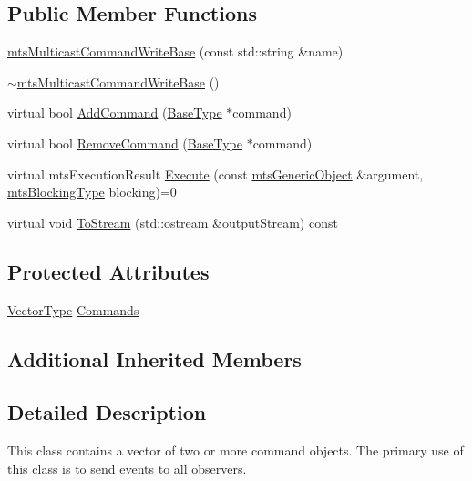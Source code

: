 \subsection*{Public Member Functions}
\begin{DoxyCompactItemize}
\item 
\hyperlink{classmts_multicast_command_write_base_a03fecc30b28f9ae0623eb8a8ba36c5d2}{mts\+Multicast\+Command\+Write\+Base} (const std\+::string \&name)
\item 
\hyperlink{classmts_multicast_command_write_base_af80f325cb7023dcef286ecaafe189841}{$\sim$mts\+Multicast\+Command\+Write\+Base} ()
\item 
virtual bool \hyperlink{classmts_multicast_command_write_base_a7163c96ed8d25927ea074bacfae410e1}{Add\+Command} (\hyperlink{classmts_command_write_base_a5d78c8590cfc73fa29d93b3678cba199}{Base\+Type} $\ast$command)
\item 
virtual bool \hyperlink{classmts_multicast_command_write_base_a2dd321ec3867b87877a7d8875e4dc896}{Remove\+Command} (\hyperlink{classmts_command_write_base_a5d78c8590cfc73fa29d93b3678cba199}{Base\+Type} $\ast$command)
\item 
virtual mts\+Execution\+Result \hyperlink{classmts_multicast_command_write_base_ab8a9cde81c9d5653defafd2093383a51}{Execute} (const \hyperlink{classmts_generic_object}{mts\+Generic\+Object} \&argument, \hyperlink{mts_forward_declarations_8h_ad7426ccb6c883bc780d0ee197dddcbe7}{mts\+Blocking\+Type} blocking)=0
\item 
virtual void \hyperlink{classmts_multicast_command_write_base_a1a82c8eadcc87d4617302be657120876}{To\+Stream} (std\+::ostream \&output\+Stream) const 
\end{DoxyCompactItemize}
\subsection*{Protected Attributes}
\begin{DoxyCompactItemize}
\item 
\hyperlink{classmts_multicast_command_write_base_a25953a3da11d172a87774cfebe55eaa9}{Vector\+Type} \hyperlink{classmts_multicast_command_write_base_a908fccc3c249bf9a0919f2294defc73e}{Commands}
\end{DoxyCompactItemize}
\subsection*{Additional Inherited Members}


\subsection{Detailed Description}
This class contains a vector of two or more command objects. The primary use of this class is to send events to all observers. 

